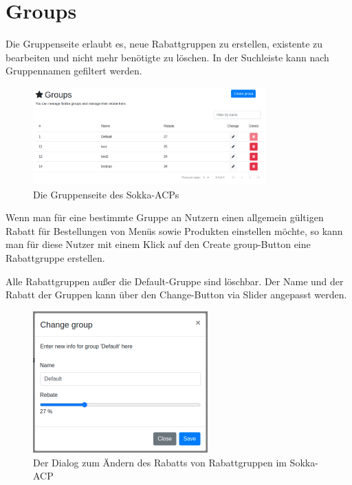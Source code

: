 \section{Groups}
\label{acp-groups}

Die Gruppenseite erlaubt es, neue Rabattgruppen zu erstellen, existente zu bearbeiten und nicht mehr benötigte zu löschen. In der Suchleiste kann nach Gruppennamen gefiltert werden.

\begin{figure}[ht]
    \centering
    \includegraphics[width=0.8\textwidth]{images/ACP/groups.png}
    \caption{Die Gruppenseite des Sokka-ACPs}
\end{figure}

Wenn man für eine bestimmte Gruppe an Nutzern einen allgemein gültigen Rabatt für Bestellungen von Menüs sowie Produkten einstellen möchte, so kann man für diese Nutzer mit einem Klick auf den \glqq Create group\grqq -Button eine Rabattgruppe erstellen.

Alle Rabattgruppen außer die Default-Gruppe sind löschbar. Der Name und der Rabatt der Gruppen kann über den \glqq Change\grqq -Button via Slider angepasst werden.

\begin{figure}[ht]
    \centering
    \includegraphics[width=0.6\textwidth]{images/ACP/groups_modal.png}
    \caption{Der Dialog zum Ändern des Rabatts von Rabattgruppen im Sokka-ACP}
\end{figure}
